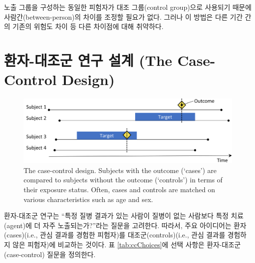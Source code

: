 \documentclass[11pt]{book}
\theoremstyle{definition}
\theoremstyle{definition}
\theoremstyle{definition}
\theoremstyle{remark}
\begin{document}
노출 그룹을 구성하는 동일한 피험자가 대조 그룹(control group)으로
사용되기 때문에 사람간(between-person)의 차이를 조정할 필요가 없다.
그러나 이 방법은 다른 기간 간의 기존의 위험도 차이 등 다른 차이점에 대해
취약하다.

\section{환자-대조군 연구 설계 (The Case-Control
Design)}\label{----the-case-control-design}


\begin{figure}[h]

{\centering \includegraphics[width=0.9\linewidth]{images/PopulationLevelEstimation/caseControl} 

}

\caption{The case-control design. Subjects with the outcome (‘cases’) are compared to subjects without the outcome (‘controls’) in terms of their exposure status. Often, cases and controls are matched on various characteristics such as age and sex.}\label{fig:caseControl}
\end{figure}

환자-대조군 연구\citep{vandenbroucke_2012}는 ``특정 질병 결과가 있는
사람이 질병이 없는 사람보다 특정 치료(agent)에 더 자주 노출되는가?''라는
질문을 고려한다. 따라서, 주요 아이디어는 환자(cases)(i.e., 관심 결과를
경험한 피험자)를 대조군(controls)(i.e., 관심 결과를 경험하지 않은
피험자)에 비교하는 것이다. 표 \ref{tab:ccChoices}에 선택 사항은
환자-대조군(case-control) 질문을 정의한다.
\end{document}
